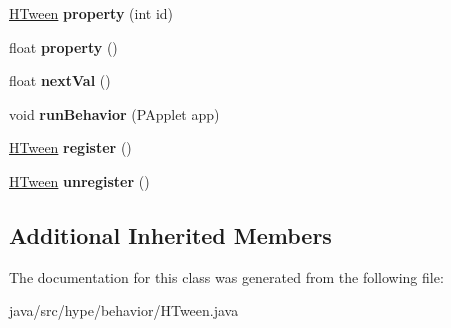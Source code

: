 \begin{DoxyCompactItemize}
\item 
\hypertarget{classhype_1_1behavior_1_1_h_tween_a7f0d7cd38ab1ca1650b5ee561a367872}{\hyperlink{classhype_1_1behavior_1_1_h_tween}{H\-Tween} {\bfseries property} (int id)}\label{classhype_1_1behavior_1_1_h_tween_a7f0d7cd38ab1ca1650b5ee561a367872}

\item 
\hypertarget{classhype_1_1behavior_1_1_h_tween_a36531f6a08eecde9bf6316c7ed434b9f}{float {\bfseries property} ()}\label{classhype_1_1behavior_1_1_h_tween_a36531f6a08eecde9bf6316c7ed434b9f}

\item 
\hypertarget{classhype_1_1behavior_1_1_h_tween_aed76e60412c5f07d925afdac4ceca836}{float {\bfseries next\-Val} ()}\label{classhype_1_1behavior_1_1_h_tween_aed76e60412c5f07d925afdac4ceca836}

\item 
\hypertarget{classhype_1_1behavior_1_1_h_tween_ac12d69a33663b6c1ece91571cacfbefa}{void {\bfseries run\-Behavior} (P\-Applet app)}\label{classhype_1_1behavior_1_1_h_tween_ac12d69a33663b6c1ece91571cacfbefa}

\item 
\hypertarget{classhype_1_1behavior_1_1_h_tween_acc1ec1b56ea2daf3188308a1029e31f6}{\hyperlink{classhype_1_1behavior_1_1_h_tween}{H\-Tween} {\bfseries register} ()}\label{classhype_1_1behavior_1_1_h_tween_acc1ec1b56ea2daf3188308a1029e31f6}

\item 
\hypertarget{classhype_1_1behavior_1_1_h_tween_ac1571701e84ef4a06f9d87ec66246ad5}{\hyperlink{classhype_1_1behavior_1_1_h_tween}{H\-Tween} {\bfseries unregister} ()}\label{classhype_1_1behavior_1_1_h_tween_ac1571701e84ef4a06f9d87ec66246ad5}

\end{DoxyCompactItemize}
\subsection*{Additional Inherited Members}


The documentation for this class was generated from the following file\-:\begin{DoxyCompactItemize}
\item 
java/src/hype/behavior/H\-Tween.\-java\end{DoxyCompactItemize}
